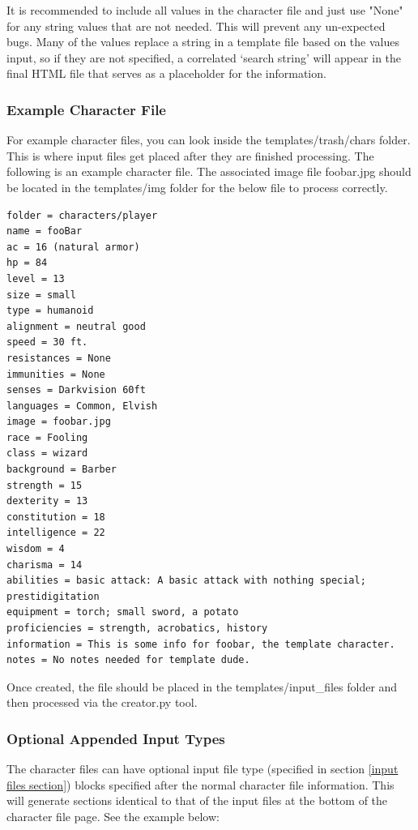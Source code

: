 It is recommended to include all values in the character file and just use "None" for any string values that are not needed. This will prevent any un-expected bugs. Many of the values replace a string in a template file based on the values input, so if they are not specified, a correlated `search string' will appear in the final HTML file that serves as a placeholder for the information.






\subsubsection{Example Character File}

For example character files, you can look inside the templates/trash/chars folder. This is where input files get placed after they are finished processing. The following is an example character file. The associated image file foobar.jpg should be located in the templates/img folder for the below file to process correctly.

\begin{lstlisting}
folder = characters/player
name = fooBar
ac = 16 (natural armor)
hp = 84
level = 13
size = small
type = humanoid
alignment = neutral good
speed = 30 ft.
resistances = None
immunities = None
senses = Darkvision 60ft
languages = Common, Elvish
image = foobar.jpg
race = Fooling
class = wizard
background = Barber
strength = 15
dexterity = 13
constitution = 18
intelligence = 22
wisdom = 4
charisma = 14
abilities = basic attack: A basic attack with nothing special; prestidigitation
equipment = torch; small sword, a potato
proficiencies = strength, acrobatics, history
information = This is some info for foobar, the template character.
notes = No notes needed for template dude.
\end{lstlisting}

Once created, the file should be placed in the templates/input\_files folder and then processed via the creator.py tool.



\subsubsection{Optional Appended Input Types}

The character files can have optional input file type (specified in section \ref{input files section}) blocks specified after the normal character file information. This will generate sections identical to that of the input files at the bottom of the character file page. See the example below:

